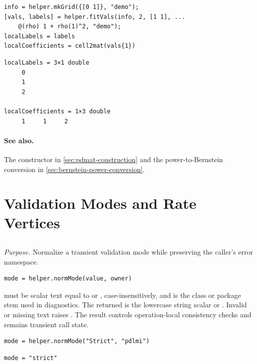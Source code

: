 \examplehead
\begin{lstlisting}[style=dpmatlab]
info = helper.mkGrid({[0 1]}, "demo");
[vals, labels] = helper.fitVals(info, 2, [1 1], ...
    @(rho) 1 + rho(1)^2, "demo");
localLabels = labels
localCoefficients = cell2mat(vals{1})
\end{lstlisting}
\begin{lstlisting}[style=dpoutput]
localLabels = 3×1 double
     0
     1
     2

localCoefficients = 1×3 double
     1     1     2
\end{lstlisting}

\paragraph{See also.} The  constructor in \cref{sec:pdmat-construction} and the power-to-Bernstein conversion in \cref{sec:bernstein-power-conversion}.

\section{Validation Modes and Rate Vertices}

\subsection{\texorpdfstring{}{helper.normMode}}

\textit{Purpose.} Normalize a transient validation mode while preserving the caller's error namespace.

\syntaxhead
\begin{lstlisting}[style=dpsyntax]
mode = helper.normMode(value, owner)
\end{lstlisting}

\descriptionhead
{} must be scalar text equal to  or , case-insensitively, and  is the class or package stem used in diagnostics. The returned  is the lowercase string scalar  or . Invalid or missing text raises . The result controls operation-local consistency checks and remains transient call state.

\examplehead
\begin{lstlisting}[style=dpmatlab]
mode = helper.normMode("Strict", "pdlmi")
\end{lstlisting}
\begin{lstlisting}[style=dpoutput]
mode = "strict"
\end{lstlisting}

